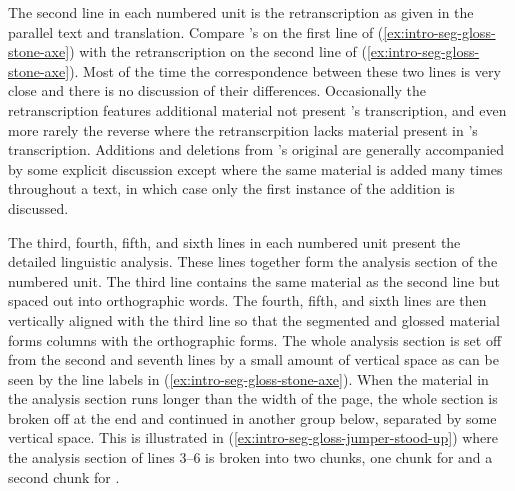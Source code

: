 The second line in each numbered unit is the retranscription as given in the parallel text and translation.
Compare \citeauthor{swanton:1909}’s  on the first line of (\ref{ex:intro-seg-gloss-stone-axe}) with the retranscription  on the second line of (\ref{ex:intro-seg-gloss-stone-axe}).
Most of the time the correspondence between these two lines is very close and there is no discussion of their differences.
Occasionally the retranscription features additional material not present \citeauthor{swanton:1909}’s transcription, and even more rarely the reverse where the retranscrpition lacks material present in \citeauthor{swanton:1909}’s transcription.
Additions and deletions from \citeauthor{swanton:1909}’s original are generally accompanied by some explicit discussion except where the same material is added many times throughout a text, in which case only the first instance of the addition is discussed.

The third, fourth, fifth, and sixth lines in each numbered unit present the detailed linguistic analysis.
These lines together form the analysis section of the numbered unit.
The third line contains the same material as the second line but spaced out into orthographic words.
The fourth, fifth, and sixth lines are then vertically aligned with the third line so that the segmented and glossed material forms columns with the orthographic forms.
The whole analysis section is set off from the second and seventh lines by a small amount of vertical space as can be seen by the line labels in (\ref{ex:intro-seg-gloss-stone-axe}).
When the material in the analysis section runs longer than the width of the page, the whole section is broken off at the end and continued in another group below, separated by some vertical space.
This is illustrated in (\ref{ex:intro-seg-gloss-jumper-stood-up}) where the analysis section of lines 3–6 is broken into two chunks, one chunk for  and a second chunk for .


